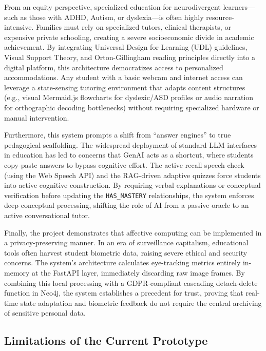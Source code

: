 \documentclass[final,5p,times,twocolumn,authoryear]{elsarticle}
\begin{document}
From an equity perspective, specialized education for neurodivergent learners—such as those with ADHD, Autism, or dyslexia—is often highly resource-intensive. Families must rely on specialized tutors, clinical therapists, or expensive private schooling, creating a severe socioeconomic divide in academic achievement. By integrating Universal Design for Learning (UDL) guidelines, Visual Support Theory, and Orton-Gillingham reading principles directly into a digital platform, this architecture democratizes access to personalized accommodations. Any student with a basic webcam and internet access can leverage a state-sensing tutoring environment that adapts content structures (e.g., visual Mermaid.js flowcharts for dyslexic/ASD profiles or audio narration for orthographic decoding bottlenecks) without requiring specialized hardware or manual intervention.

Furthermore, this system prompts a shift from ``answer engines'' to true pedagogical scaffolding. The widespread deployment of standard LLM interfaces in education has led to concerns that GenAI acts as a shortcut, where students copy-paste answers to bypass cognitive effort. The active recall speech check (using the Web Speech API) and the RAG-driven adaptive quizzes force students into active cognitive construction. By requiring verbal explanations or conceptual verification before updating the \texttt{HAS\_MASTERY} relationships, the system enforces deep conceptual processing, shifting the role of AI from a passive oracle to an active conversational tutor.

Finally, the project demonstrates that affective computing can be implemented in a privacy-preserving manner. In an era of surveillance capitalism, educational tools often harvest student biometric data, raising severe ethical and security concerns. The system's architecture calculates eye-tracking metrics entirely in-memory at the FastAPI layer, immediately discarding raw image frames. By combining this local processing with a GDPR-compliant cascading detach-delete function in Neo4j, the system establishes a precedent for trust, proving that real-time state adaptation and biometric feedback do not require the central archiving of sensitive personal data.

\subsection{Limitations of the Current Prototype}
\label{subsec:limitations_prototype}
\end{document}

